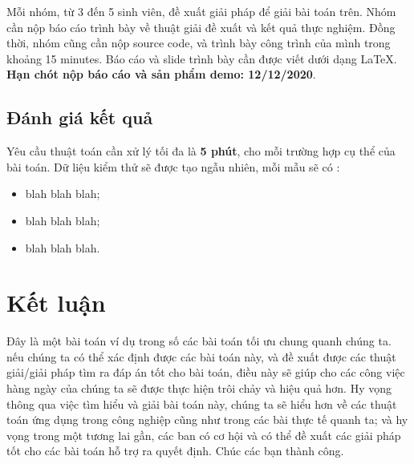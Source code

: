 \documentclass[11pt]{article}
\begin{document}
Mỗi nhóm, từ 3 đến 5 sinh viên, đề xuất giải pháp để giải bài toán trên. 
Nhóm cần nộp báo cáo trình bày về thuật giải đề xuất và kết quả thực nghiệm. Đồng thời, nhóm cũng cần nộp source code, và trình bày công trình của mình trong khoảng 15 minutes.
Báo cáo và slide trình bày cần được viết dưới dạng LaTeX.  
\textbf{Hạn chót nộp báo cáo và sản phẩm demo: 12/12/2020}.


\subsection{\texorpdfstring{Đánh giá kết quả}{Evaluation}}\label{eval}

Yêu cầu thuật toán cần xử lý tối đa là \textbf{5 phút}, cho mỗi trường hợp cụ thể của bài toán.
Dữ liệu kiểm thử sẽ được tạo ngẫu nhiên, mỗi mẫu sẽ có :

\begin{itemize}
	\item blah blah blah;
	\item blah blah blah;
	\item blah blah blah.
\end{itemize}


\section{\texorpdfstring{Kết luận}{Conclusion}}\label{conclusion}

Đây là một bài toán ví dụ trong số các bài toán tối ưu chung quanh chúng ta.
nếu chúng ta có thể xác định được các bài toán này, và đề xuất được các thuật giải/giải pháp tìm ra đáp án tốt cho bài toán, điều này sẽ giúp cho các công việc hàng ngày của chúng ta sẽ được thực hiện trôi chảy và hiệu quả hơn.
Hy vọng thông qua việc tìm hiểu và giải bài toán này, chúng ta sẽ hiểu hơn về các thuật toán ứng dụng trong công nghiệp cũng như trong các bài thực tế quanh ta; và hy vọng trong một tương lai gần, các ban có cơ hội và có thể đề xuất các giải pháp tốt cho các bài toán hỗ trợ ra quyết định. 
Chúc các bạn thành công.
\end{document}
